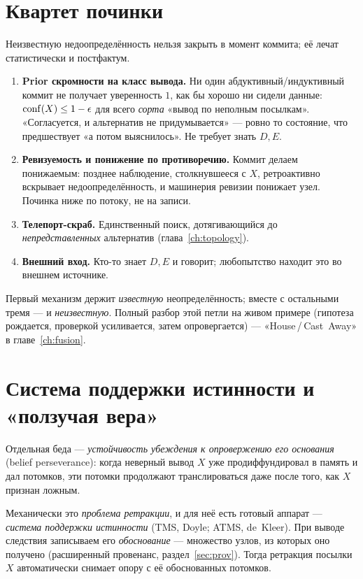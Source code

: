 \section{Квартет починки}

Неизвестную недоопределённость нельзя закрыть в момент коммита; её лечат
статистически и постфактум.

\begin{enumerate}
\item \textbf{Prior скромности на класс вывода.} Ни один абдуктивный/индуктивный
коммит не получает уверенность $1$, как бы хорошо ни сидели данные:
$\mathrm{conf}(X)\le 1-\epsilon$ для всего \emph{сорта} «вывод по неполным посылкам».
«Согласуется, и альтернатив не придумывается» — ровно то состояние, что
предшествует «а потом выяснилось». Не требует знать $D,E$.
\item \textbf{Ревизуемость и понижение по противоречию.} Коммит делаем понижаемым:
позднее наблюдение, столкнувшееся с $X$, ретроактивно вскрывает недоопределённость,
и машинерия ревизии понижает узел. Починка ниже по потоку, не на записи.
\item \textbf{Телепорт-скраб.} Единственный поиск, дотягивающийся до
\emph{непредставленных} альтернатив (глава~\ref{ch:topology}).
\item \textbf{Внешний вход.} Кто-то знает $D,E$ и говорит; любопытство находит это
во внешнем источнике.
\end{enumerate}
Первый механизм держит \emph{известную} неопределённость; вместе с остальными тремя
— и \emph{неизвестную}. Полный разбор этой петли на живом примере (гипотеза
рождается, проверкой усиливается, затем опровергается) — «House\,/\,Cast~Away» в
главе~\ref{ch:fusion}.

\section{Система поддержки истинности и «ползучая вера»}

Отдельная беда — \emph{устойчивость убеждения к опровержению его основания}
(belief perseverance): когда неверный вывод $X$ уже продиффундировал в память и дал
потомков, эти потомки продолжают транслироваться даже после того, как $X$ признан
ложным.

Механически это \emph{проблема ретракции}, и для неё есть готовый аппарат —
\emph{система поддержки истинности} (TMS, Doyle; ATMS, de~Kleer). При выводе
следствия записываем его \emph{обоснование} — множество узлов, из которых оно
получено (расширенный провенанс, раздел~\ref{sec:prov}). Тогда ретракция посылки
$X$ автоматически снимает опору с её обоснованных потомков.

